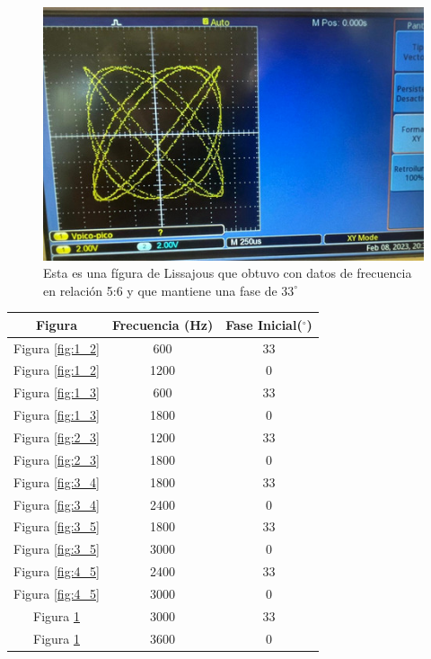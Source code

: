 \documentclass[a4paper, amsfonts, amssymb, amsmath, reprint, showkeys, nofootinbib, twoside]{revtex4-1}
\begin{document}
\begin{figure}[H]
    \centering
    \includegraphics[scale=0.4]{Exp2_Img7.jpeg}
    \caption{Esta es una fígura de Lissajous que obtuvo con datos de frecuencia en relación 5:6 y que mantiene una fase de $33^\circ$}
    \label{fig:5_6}
\end{figure}

\begin{center}
    \begin{tabular}{|c|c|c|}
        \hline
        Figura & Frecuencia (Hz) & Fase Inicial($^\circ$)\\
        \hline
        Figura \ref{fig:1_2} & 600 & 33\\
        Figura \ref{fig:1_2} & 1200 & 0\\
        Figura \ref{fig:1_3} & 600 & 33\\
        Figura \ref{fig:1_3} & 1800 & 0\\
        Figura \ref{fig:2_3} & 1200 & 33\\
        Figura \ref{fig:2_3} & 1800 & 0\\
        Figura \ref{fig:3_4} & 1800 & 33\\
        Figura \ref{fig:3_4} & 2400 & 0\\
        Figura \ref{fig:3_5} & 1800 & 33\\
        Figura \ref{fig:3_5} & 3000 & 0\\
        Figura \ref{fig:4_5} & 2400 & 33\\
        Figura \ref{fig:4_5} & 3000 & 0\\
        Figura \ref{fig:5_6} & 3000 & 33\\
        Figura \ref{fig:5_6} & 3600 & 0\\
        \hline
    \end{tabular}
\end{center}
\end{document}
